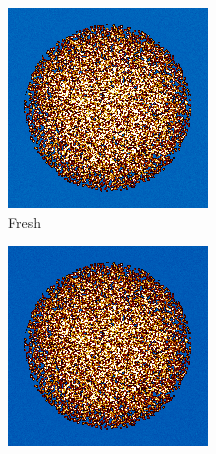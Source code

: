 \begin{figure}
\centering
%
\begin{subfigure}{0.25\textwidth}
  \includegraphics[width=0.95\linewidth]{figures/burn-20-bstep0}
  \caption{Fresh}
  \label{fig:bstep0}
\end{subfigure}%
%
\begin{subfigure}{0.25\textwidth}
  \includegraphics[width=0.95\linewidth]{figures/burn-20-bstep1}

\end{subfigure}
\end{figure}
